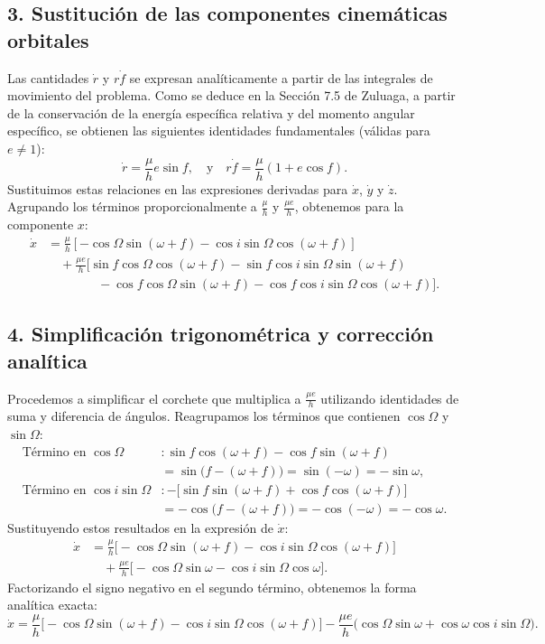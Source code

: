 \documentclass[12pt, a4paper]{article}
\begin{document}
\subsection*{3. Sustitución de las componentes cinemáticas orbitales}
Las cantidades $\dot{r}$ y $r\dot{f}$ se expresan analíticamente a partir de las integrales de movimiento del problema. Como se deduce en la Sección 7.5 de Zuluaga, a partir de la conservación de la energía específica relativa y del momento angular específico, se obtienen las siguientes identidades fundamentales (válidas para $e \neq 1$):
\begin{equation}
\dot{r} = \frac{\mu}{h} e \sin f, \quad \text{y} \quad r\dot{f} = \frac{\mu}{h} (1 + e \cos f).
\end{equation}
Sustituimos estas relaciones en las expresiones derivadas para $\dot{x}$, $\dot{y}$ y $\dot{z}$. Agrupando los términos proporcionalmente a $\frac{\mu}{h}$ y $\frac{\mu e}{h}$, obtenemos para la componente $x$:
\begin{align*}
\dot{x} &= \frac{\mu}{h} \left[ -\cos\Omega \sin(\omega+f) - \cos i \sin\Omega \cos(\omega+f) \right] \\
&\quad + \frac{\mu e}{h} \Big[ \sin f \cos\Omega \cos(\omega+f) - \sin f \cos i \sin\Omega \sin(\omega+f) \\
&\quad\quad\quad\quad - \cos f \cos\Omega \sin(\omega+f) - \cos f \cos i \sin\Omega \cos(\omega+f) \Big].
\end{align*}

\subsection*{4. Simplificación trigonométrica y corrección analítica}
Procedemos a simplificar el corchete que multiplica a $\frac{\mu e}{h}$ utilizando identidades de suma y diferencia de ángulos. Reagrupamos los términos que contienen $\cos\Omega$ y $\sin\Omega$:
\begin{align*}
\text{Término en } \cos\Omega &: \sin f \cos(\omega+f) - \cos f \sin(\omega+f) \\
&= \sin\!\big(f - (\omega+f)\big) = \sin(-\omega) = -\sin\omega, \\[6pt]
\text{Término en } \cos i \sin\Omega &: -\!\Big[ \sin f \sin(\omega+f) + \cos f \cos(\omega+f) \Big] \\
&= -\cos\!\big(f - (\omega+f)\big) = -\cos(-\omega) = -\cos\omega.
\end{align*}
Sustituyendo estos resultados en la expresión de $\dot{x}$:
\begin{align*}
\dot{x} &= \frac{\mu}{h} \Big[ -\cos\Omega \sin(\omega+f) - \cos i \sin\Omega \cos(\omega+f) \Big] \\
&\quad + \frac{\mu e}{h} \Big[ -\cos\Omega \sin\omega - \cos i \sin\Omega \cos\omega \Big].
\end{align*}
Factorizando el signo negativo en el segundo término, obtenemos la forma analítica exacta:
\begin{equation}
\dot{x} = \frac{\mu}{h} \Big[ -\cos\Omega \sin(\omega+f) - \cos i \sin\Omega \cos(\omega+f) \Big] 
- \frac{\mu e}{h} \Big( \cos\Omega \sin\omega + \cos\omega \cos i \sin\Omega \Big).
\end{equation}
\end{document}
